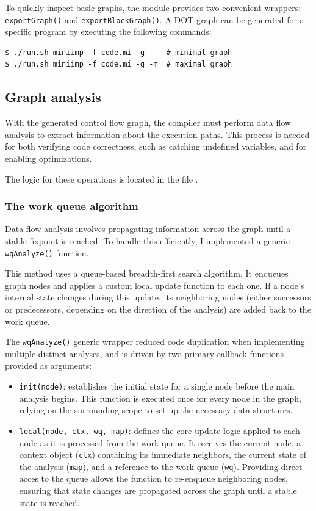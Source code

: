 \documentclass[12pt]{article}
\newcommand{\Code}[1]{\texttt{#1}}
\begin{document}
To quickly inspect basic graphs, the module provides two convenient wrappers:
\Code{exportGraph()} and \Code{exportBlockGraph()}. A DOT graph can be generated
for a specific program by executing the following commands:
\begin{verbatim}
$ ./run.sh miniimp -f code.mi -g     # minimal graph
$ ./run.sh miniimp -f code.mi -g -m  # maximal graph
\end{verbatim}

\subsection{Graph analysis}

With the generated control flow graph, the compiler must perform data flow
analysis to extract information about the execution paths. This process is
needed for both verifying code correctness, such as catching undefined
variables, and for enabling optimizations.

The logic for these operations is located in the file
.

\subsubsection{The work queue algorithm}

Data flow analysis involves propagating information across the graph until a
stable fixpoint is reached. To handle this efficiently, I implemented a generic
\Code{wqAnalyze()} function.

This method uses a queue-based breadth-first search algorithm. It enqueues graph
nodes and applies a custom local update function to each one. If a node's
internal state changes during this update, its neighboring nodes (either
successors or predecessors, depending on the direction of the analysis) are
added back to the work queue.

The \Code{wqAnalyze()} generic wrapper reduced code duplication when
implementing multiple distinct analyses, and is driven by two primary callback
functions provided as arguments:
\begin{itemize}
    \item \Code{init(node)}: establishes the initial state for a single node
        before the main analysis begins. This function is executed once for
        every node in the graph, relying on the surrounding scope to set up the
        necessary data structures.
    \item \Code{local(node, ctx, wq, map)}: defines the core update logic
        applied to each node as it is processed from the work queue. It receives
        the current node, a context object (\Code{ctx}) containing its immediate
        neighbors, the current state of the analysis (\Code{map}), and a
        reference to the work queue (\Code{wq}). Providing direct acces to the
        queue allows the function to re-enqueue neighboring nodes, ensuring that
        state changes are propagated across the graph until a stable state is
        reached.
\end{itemize}
\end{document}
